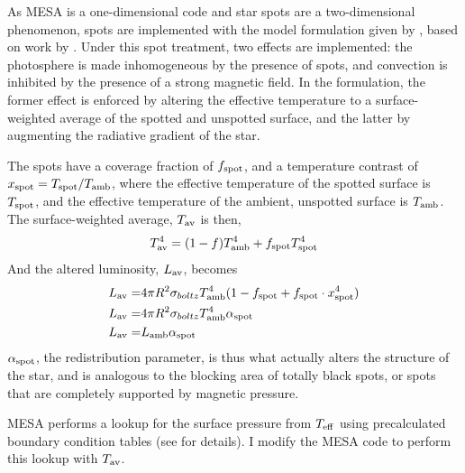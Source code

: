 As MESA is a one-dimensional code and star spots are a two-dimensional phenomenon, spots are implemented with the model formulation given by \citet{sommers2015}, based on work by \citet{spruit1986}.
Under this spot treatment, two effects are implemented: the photosphere is made inhomogeneous by the presence of spots, and convection is inhibited by the presence of a strong magnetic field.
In the \citet{sommers2015} formulation, the former effect is enforced by altering the effective temperature to a surface-weighted average of the spotted and unspotted surface, and the latter by augmenting the radiative gradient of the star.

The spots have a coverage fraction of $f_{\rm spot}$, and a temperature contrast of $x_{\rm spot} = T_{\rm  spot} / T_{\rm amb}$, where the effective temperature of the spotted surface is $T_{\rm spot}$, and the effective temperature of the ambient, unspotted surface is $T_{\rm amb}$. The surface-weighted average, $T_{\rm av}$ is then,
\begin{equation}
    \label{eqn:modelling:surface weighted average temp}
    T_{\rm av}^4 = (1-f) T_{\rm amb}^4 + f_{\rm spot} T_{\rm spot}^4
\end{equation}
And the altered luminosity, $L_{\rm av}$, becomes
\begin{align}
    L_{\rm av} =& 4\pi R^2 \sigma_{boltz} T_{\rm amb}^4 (1 - f_{\rm spot} + f_{\rm spot} \cdot x_{\rm spot}^4) \\
    L_{\rm av} =& 4\pi R^2 \sigma_{boltz} T_{\rm amb}^4 \alpha_{\rm spot} \\
    L_{\rm av} =& L_{\rm amb} \alpha_{\rm spot} \\
\end{align}
$\alpha_{\rm spot}$, the redistribution parameter, is thus what actually alters the structure of the star, and is analogous to the blocking area of totally black spots, or spots that are completely supported by magnetic pressure.

MESA performs a lookup for the surface pressure from $T_{\rm eff}$ using precalculated boundary condition tables (see \citet{paxton2010,paxton2011} for details). I modify the MESA code to perform this lookup with $T_{\rm av}$.

